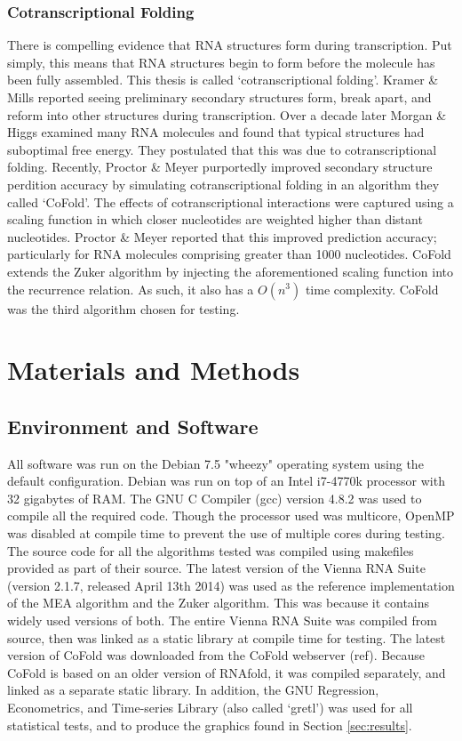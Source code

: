 \documentclass[12pt, a4paper]{article}
\begin{document}
\subsubsection{Cotranscriptional Folding}
There is compelling evidence that RNA structures form during transcription. Put simply, this means that RNA structures begin to form before the molecule has been fully assembled. This thesis is called `cotranscriptional folding'. Kramer \& Mills \cite{kramer1981secondary} reported seeing preliminary secondary structures form, break apart, and reform into other structures during transcription. Over a decade later Morgan \& Higgs \cite{morgan1996evidence} examined many RNA molecules and found that typical structures had suboptimal free energy. They postulated that this was due to cotranscriptional folding. Recently, Proctor \& Meyer \cite{proctor2013cofold} purportedly improved secondary structure perdition accuracy by simulating cotranscriptional folding in an algorithm they called `CoFold'. The effects of cotranscriptional interactions were captured using a scaling function in which closer nucleotides are weighted higher than distant nucleotides. Proctor \& Meyer \cite{proctor2013cofold} reported that this improved prediction accuracy; particularly for RNA molecules comprising greater than 1000 nucleotides. CoFold extends the Zuker algorithm by injecting the aforementioned scaling function into the recurrence relation. As such, it also has a $O(n^3)$ time complexity. CoFold was the third algorithm chosen for testing.

\section{Materials and Methods}
\subsection{Environment and Software}
All software was run on the Debian 7.5 "wheezy" operating system using the default configuration. Debian was run on top of an Intel i7-4770k processor with 32 gigabytes of RAM. The GNU C Compiler (gcc) version 4.8.2 was used to compile all the required code. Though the processor used was multicore, OpenMP was disabled at compile time to prevent the use of multiple cores during testing. The source code for all the algorithms tested was compiled using makefiles provided as part of their source. The latest version of the Vienna RNA Suite (version 2.1.7, released April 13th 2014) was used as the reference implementation of the MEA algorithm and the Zuker algorithm. This was because it contains widely used versions of both. The entire Vienna RNA Suite was compiled from source, then was linked as a static library at compile time for testing. The latest version of CoFold was downloaded from the CoFold webserver (ref). Because CoFold is based on an older version of RNAfold, it was compiled separately, and linked as a separate static library. In addition, the GNU Regression, Econometrics, and Time-series Library (also called `gretl') was used for all statistical tests, and to produce the graphics found in Section \ref{sec:results}.
\end{document}
